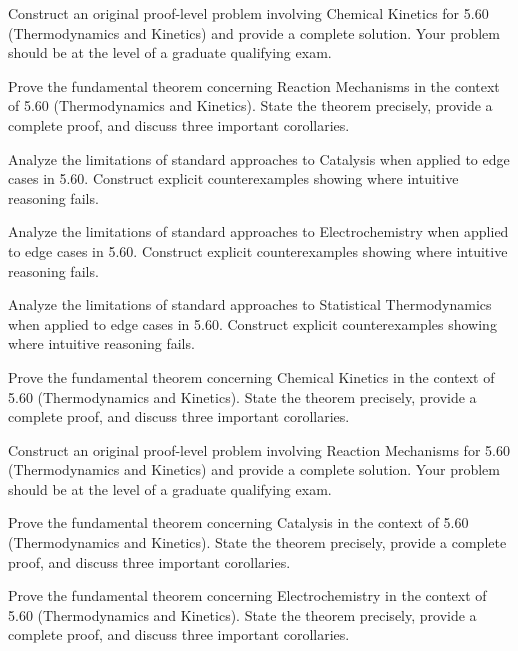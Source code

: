 \documentclass[12pt,a4paper]{exam}
\begin{document}
\begin{questions}
\vspace{0.3cm}

\question[2]
Construct an original proof-level problem involving Chemical Kinetics for 5.60 (Thermodynamics and Kinetics) and provide a complete solution. Your problem should be at the level of a graduate qualifying exam.

\vspace{0.3cm}

\question[2]
Prove the fundamental theorem concerning Reaction Mechanisms in the context of 5.60 (Thermodynamics and Kinetics). State the theorem precisely, provide a complete proof, and discuss three important corollaries.

\vspace{0.3cm}

\question[4]
Analyze the limitations of standard approaches to Catalysis when applied to edge cases in 5.60. Construct explicit counterexamples showing where intuitive reasoning fails.

\vspace{0.3cm}

\question[3]
Analyze the limitations of standard approaches to Electrochemistry when applied to edge cases in 5.60. Construct explicit counterexamples showing where intuitive reasoning fails.

\vspace{0.3cm}

\question[5]
Analyze the limitations of standard approaches to Statistical Thermodynamics when applied to edge cases in 5.60. Construct explicit counterexamples showing where intuitive reasoning fails.

\vspace{0.3cm}

\question[4]
Prove the fundamental theorem concerning Chemical Kinetics in the context of 5.60 (Thermodynamics and Kinetics). State the theorem precisely, provide a complete proof, and discuss three important corollaries.

\vspace{0.3cm}

\question[4]
Construct an original proof-level problem involving Reaction Mechanisms for 5.60 (Thermodynamics and Kinetics) and provide a complete solution. Your problem should be at the level of a graduate qualifying exam.

\vspace{0.3cm}

\question[4]
Prove the fundamental theorem concerning Catalysis in the context of 5.60 (Thermodynamics and Kinetics). State the theorem precisely, provide a complete proof, and discuss three important corollaries.

\vspace{0.3cm}

\question[6]
Prove the fundamental theorem concerning Electrochemistry in the context of 5.60 (Thermodynamics and Kinetics). State the theorem precisely, provide a complete proof, and discuss three important corollaries.

\vspace{0.3cm}

\end{questions}
\end{document}

